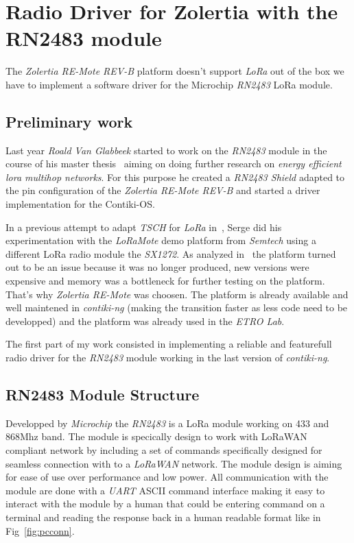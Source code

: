 \chapter{Radio Driver for Zolertia with the RN2483 module\label{section:radio}}


The \emph{Zolertia RE-Mote REV-B} platform doesn't support \emph{LoRa} out of the
box we have to implement a software driver for the Microchip \emph{RN2483} LoRa
module.

\section{Preliminary work}

Last year \emph{Roald Van Glabbeek} started to work on the \emph{RN2483} module
in the course of his master thesis~\cite{8847137} aiming on doing further
research on \emph{energy efficient lora multihop networks}.
For this purpose he created a \emph{RN2483 Shield} adapted to the pin
configuration of the \emph{Zolertia RE-Mote REV-B} and started a driver
implementation for the Contiki-OS\@.

In a previous attempt to adapt \emph{TSCH} for \emph{LoRa}
in~\cite{njomgang_2018}, Serge did his experimentation with the \emph{LoRaMote}
demo platform from \emph{Semtech} using a different LoRa radio module the
\emph{SX1272}. 
As analyzed in~\cite{8847137} the platform turned out to be an
issue because it was no longer produced, new versions were expensive and memory
was a bottleneck for further testing on the platform.
That's why \emph{Zolertia RE-Mote} was choosen. The platform is already available 
and well maintened in \emph{contiki-ng} (making the transition faster as less
code need to be developped) and the platform was already used in the \emph{ETRO Lab}.

The first part of my work consisted in implementing a reliable
and featurefull radio driver for the \emph{RN2483} module working in the last
version of \emph{contiki-ng}.

\section{RN2483 Module Structure}

Developped by \emph{Microchip} the \emph{RN2483} is a LoRa module working on
433 and 868Mhz band. The module is specically design to work with LoRaWAN
compliant network by including a set of commands specifically designed for
seamless connection with to a \emph{LoRaWAN} network. The module design is
aiming for ease of use over performance and low power.
All communication with the module are done with a \emph{UART} ASCII command
interface making it easy to interact with the module by a human that could be
entering command on a terminal and reading the response back in a human
readable format like in Fig~\ref{fig:pcconn}.

